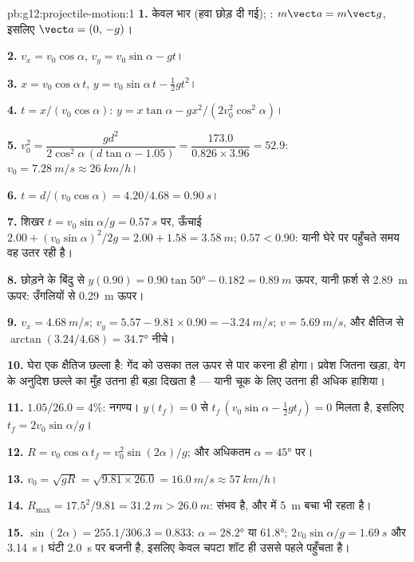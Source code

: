 \begin{solution}{pb:g12:projectile-motion:1}
\textbf{1.} केवल भार (हवा छोड़ दी गई); :
$m\vect a = m\vect g$, इसलिए $\vect a = (0,\,-g)$।

\textbf{2.} $v_x = v_0\cos\alpha$, $v_y = v_0\sin\alpha - gt$।

\textbf{3.} $x = v_0\cos\alpha\, t$, $y = v_0\sin\alpha\, t - \tfrac12 gt^2$।

\textbf{4.} $t = x/(v_0\cos\alpha)$: $y = x\tan\alpha - g x^2/(2v_0^2\cos^2\alpha)$।

\textbf{5.} $v_0^2 = \dfrac{g d^2}{2\cos^2\alpha\,(d\tan\alpha -
1.05)} = \dfrac{173.0}{0.826 \times 3.96} = 52.9$: $v_0 = \qty{7.28}{m/s} \approx \qty{26}{km/h}$।

\textbf{6.} $t = d/(v_0\cos\alpha) = 4.20/4.68 = \qty{0.90}{s}$।

\textbf{7.} शिखर $t = v_0\sin\alpha/g = \qty{0.57}{s}$ पर, ऊँचाई $2.00 + (v_0\sin\alpha)^2/2g = 2.00 + 1.58 = \qty{3.58}{m}$; $0.57 < 0.90$: यानी घेरे पर पहुँचते समय
वह उतर रही है।

\textbf{8.} छोड़ने के बिंदु से $y(0.90) = 0.90\tan\ang{50} - 0.182 = \qty{0.89}{m}$ ऊपर, यानी फ़र्श से \qty{2.89}{m} ऊपर:
उँगलियों से \qty{0.29}{m} ऊपर।

\textbf{9.} $v_x = \qty{4.68}{m/s}$; $v_y = 5.57 - 9.81 \times 0.90 = \qty{-3.24}{m/s}$; $v = \qty{5.69}{m/s}$, और क्षैतिज से $\arctan(3.24/4.68) = \ang{34.7}$ नीचे।

\textbf{10.} घेरा एक क्षैतिज छल्ला है: गेंद को उसका तल ऊपर से पार करना ही
होगा। प्रवेश जितना खड़ा, वेग के अनुदिश छल्ले का मुँह उतना ही बड़ा दिखता है
--- यानी चूक के लिए उतना ही अधिक हाशिया।

\textbf{11.} $1.05/26.0 = 4\%$: नगण्य। $y(t_f) = 0$ से $t_f\,(v_0\sin\alpha - \tfrac12 g t_f) = 0$ मिलता है, इसलिए $t_f = 2v_0\sin\alpha/g$।

\textbf{12.} $R = v_0\cos\alpha\, t_f = v_0^2\sin(2\alpha)/g$; और अधिकतम $\alpha = \ang{45}$ पर।

\textbf{13.} $v_0 = \sqrt{gR} = \sqrt{9.81 \times 26.0} =
\qty{16.0}{m/s} \approx \qty{57}{km/h}$।

\textbf{14.} $R_{\max} = 17.5^2/9.81 = \qty{31.2}{m} >
\qty{26.0}{m}$: संभव है, और  में \qty{5}{m} बचा भी रहता है।

\textbf{15.} $\sin(2\alpha) = 255.1/306.3 = 0.833$: $\alpha = \ang{28.2}$ या \ang{61.8};  $2v_0\sin\alpha/g = \qty{1.69}{s}$ और \qty{3.14}{s}। घंटी
\qty{2.0}{s} पर बजनी है, इसलिए केवल चपटा शॉट ही उससे पहले पहुँचता है।


\end{solution}
